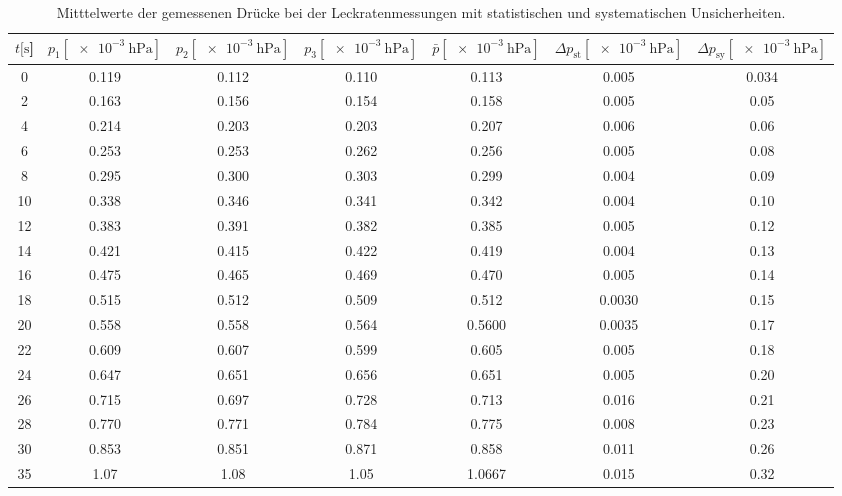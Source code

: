 \begin{table}[H]
  \centering
    \caption{Mitttelwerte der gemessenen Drücke bei der Leckratenmessungen mit statistischen und systematischen Unsicherheiten.}
    \label{tab:Turbo_Leck3}
    \begin{tabular}{
      S[table-format=3.0] 
      S[table-format=1.3] S[table-format=1.3] S[table-format=1.3]
      S[table-format=1.4] S[table-format=1.4] S[table-format=1.3]
      }
      \toprule
      {$t [\si{\second}$]} &
      {$p_1 [\SI{e-3}{\hecto\pascal}]$} & {$p_2 [\SI{e-3}{\hecto\pascal}]$} & {$p_3 [\SI{e-3}{\hecto\pascal}]$} &
      {$\bar{p} [\SI{e-3}{\hecto\pascal}]$} & {$\Delta p_\text{st} [\SI{e-3}{\hecto\pascal}]$} & {$\Delta p_\text{sy} [\SI{e-3}{\hecto\pascal}]$}\\
         & 0.119 & 0.112 &  0.110 &  0.113  & 0.005 & 0.034 \\
      2   & 0.163 & 0.156 &  0.154 &  0.158  & 0.005 & 0.05  \\
      4   & 0.214 & 0.203 &  0.203 &  0.207  & 0.006 & 0.06  \\
      6   & 0.253 & 0.253 &  0.262 &  0.256  & 0.005 & 0.08  \\
      8   & 0.295 & 0.300 &  0.303 &  0.299  & 0.004 & 0.09  \\
      10  & 0.338 & 0.346 &  0.341 &  0.342  & 0.004 & 0.10  \\
      12  & 0.383 & 0.391 &  0.382 &  0.385  & 0.005 & 0.12  \\
      14  & 0.421 & 0.415 &  0.422 &  0.419  & 0.004 & 0.13  \\
      16  & 0.475 & 0.465 &  0.469 &  0.470  & 0.005 & 0.14  \\
      18  & 0.515 & 0.512 &  0.509 &  0.512  & 0.0030& 0.15  \\
      20  & 0.558 & 0.558 &  0.564 &  0.5600 & 0.0035& 0.17  \\
      22  & 0.609 & 0.607 &  0.599 &  0.605  & 0.005 & 0.18  \\
      24  & 0.647 & 0.651 &  0.656 &  0.651  & 0.005 & 0.20  \\
      26  & 0.715 & 0.697 &  0.728 &  0.713  & 0.016 & 0.21  \\
      28  & 0.770 & 0.771 &  0.784 &  0.775  & 0.008 & 0.23  \\
      30  & 0.853 & 0.851 &  0.871 &  0.858  & 0.011 & 0.26  \\
      35  & 1.07  & 1.08  &  1.05  &  1.0667 & 0.015 & 0.32  \\

\end{tabular}
\end{table}
